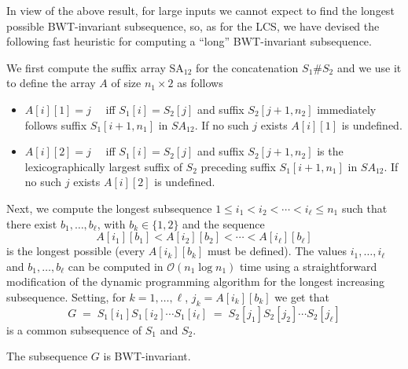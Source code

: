 \documentclass{llncs}
\newcommand{\Oh}[1]
  {\ensuremath{\mathcal{O}\!\left( {#1} \right)}}
\begin{document}
In view of the above result, for large inputs we cannot expect to find the
longest possible BWT-invariant subsequence, so, as for the LCS, we have
devised the following fast heuristic for computing a ``long'' BWT-invariant
subsequence.

We first compute the suffix array SA$_{12}$ for the concatenation $S_1\#S_2$
and we use it to define the array $A$ of size $n_1 \times 2$ as follows
\begin{itemize}
\item $A[i][1] = j\quad$ iff $S_1[i] = S_2[j]$ and suffix $S_2[j+1,n_2]$
    immediately follows suffix $S_1[i+1,n_1]$ in $SA_{12}$. If no such
    $j$ exists $A[i][1]$ is undefined.
\item $A[i][2] = j\quad$ iff $S_1[i] = S_2[j]$ and suffix $S_2[j+1,n_2]$
    is the lexicographically largest suffix of $S_2$ preceding suffix
    $S_1[i+1,n_1]$ in $SA_{12}$. If no such $j$ exists $A[i][2]$ is
    undefined.
\end{itemize}
Next, we compute the longest subsequence $1 \leq i_1 < i_2 < \cdots < i_\ell
\leq n_1$ such that there exist $b_1, \ldots, b_\ell$, with $b_k \in \{1,2\}$
and the sequence
$$
A[i_1][b_1] < A[i_2][b_2] < \cdots < A[i_\ell][b_\ell]
$$
is the longest possible (every $A[i_k][b_k]$ must be defined). The values
$i_1, \ldots, i_\ell$ and $b_1, \ldots, b_\ell$ can be computed in
$\Oh{n_1\log n_1}$ time using a straightforward modification of the dynamic
programming algorithm for the longest increasing subsequence. Setting, for
$k=1,\ldots,\ell$, $j_k = A[i_k][b_k]$ we get that
$$
G \;= \; S_1[i_1] S_1[i_2] \cdots S_1[i_\ell] \; = \; S_2[j_1] S_2[j_2] \cdots S_2[j_\ell]
$$
is a common subsequence of $S_1$ and $S_2$.

\begin{lemma}\label{lemma:bwtinv}
The subsequence $G$ is BWT-invariant.
\end{lemma}
\end{document}
